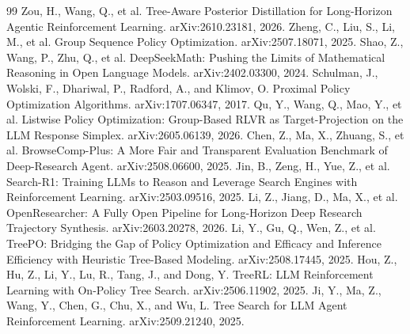 \documentclass[11pt]{article}
\begin{document}
\begin{thebibliography}{99}
 Zou, H., Wang, Q., et al. Tree-Aware Posterior
Distillation for Long-Horizon Agentic Reinforcement Learning.
arXiv:2610.23181, 2026.
 Zheng, C., Liu, S., Li, M., et al. Group Sequence Policy
Optimization. arXiv:2507.18071, 2025.
 Shao, Z., Wang, P., Zhu, Q., et al. DeepSeekMath: Pushing
the Limits of Mathematical Reasoning in Open Language Models.
arXiv:2402.03300, 2024.
 Schulman, J., Wolski, F., Dhariwal, P., Radford, A., and
Klimov, O. Proximal Policy Optimization Algorithms. arXiv:1707.06347,
2017.
 Qu, Y., Wang, Q., Mao, Y., et al. Listwise Policy
Optimization: Group-Based RLVR as Target-Projection on the LLM Response
Simplex. arXiv:2605.06139, 2026.
 Chen, Z., Ma, X., Zhuang, S., et al. BrowseComp-Plus: A
More Fair and Transparent Evaluation Benchmark of Deep-Research Agent.
arXiv:2508.06600, 2025.
 Jin, B., Zeng, H., Yue, Z., et al. Search-R1: Training
LLMs to Reason and Leverage Search Engines with Reinforcement Learning.
arXiv:2503.09516, 2025.
 Li, Z., Jiang, D., Ma, X., et al.
OpenResearcher: A Fully Open Pipeline for Long-Horizon Deep Research
Trajectory Synthesis. arXiv:2603.20278, 2026.
 Li, Y., Gu, Q., Wen, Z., et al. TreePO: Bridging the
Gap of Policy Optimization and Efficacy and Inference Efficiency with
Heuristic Tree-Based Modeling. arXiv:2508.17445, 2025.
 Hou, Z., Hu, Z., Li, Y., Lu, R., Tang, J., and Dong, Y.
TreeRL: LLM Reinforcement Learning with On-Policy Tree Search.
arXiv:2506.11902, 2025.
 Ji, Y., Ma, Z., Wang, Y., Chen, G., Chu, X., and Wu, L.
Tree Search for LLM Agent Reinforcement Learning. arXiv:2509.21240,
2025.
\end{thebibliography}
\end{document}
